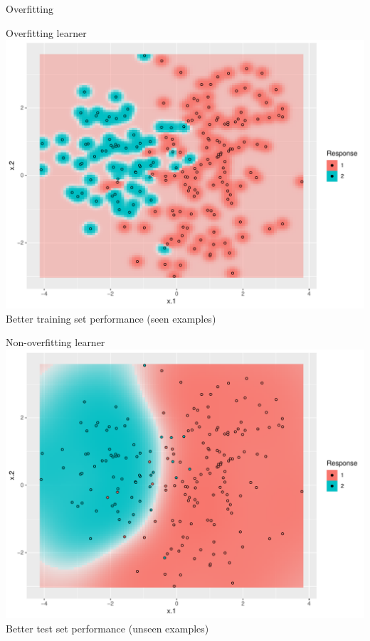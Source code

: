 \begin{vbframe}{Overfitting}

\begin{minipage}[t]{0.5\textwidth}
  \raggedright
  Overfitting learner\\
  \lz
  \includegraphics[width=\textwidth]{figure/eval_ofit_1}
  Better training set performance (seen examples)
\end{minipage}%
\begin{minipage}[t]{0.5\textwidth}
  \raggedright
  Non-overfitting learner\\
  \lz
  \includegraphics[width=\textwidth]{figure/eval_ofit_2}
  Better test set performance (unseen examples)
\end{minipage}


\end{vbframe}
